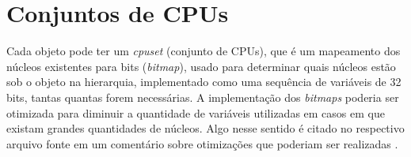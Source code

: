\section{Conjuntos de CPUs}
\label{sec:conjuntos_de_cpus}

Cada objeto pode ter um \textit{cpuset} (conjunto de CPUs), que é um mapeamento dos núcleos existentes para bits (\textit{bitmap}), usado para determinar quais núcleos estão sob o objeto na hierarquia, implementado como uma sequência de variáveis de 32 bits, tantas quantas forem necessárias.
A implementação dos \textit{bitmaps} poderia ser otimizada para diminuir a quantidade de variáveis utilizadas em casos em que existam grandes quantidades de núcleos.
Algo nesse sentido é citado no respectivo arquivo fonte em um comentário sobre otimizações que poderiam ser realizadas \cite{hwlocCod}.